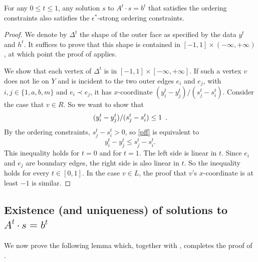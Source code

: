 
\begin{lem}
   For any $0\le t\le 1$, any solution $s$ to $A^t\cdot s = b^t$
   that satisfies the ordering constraints also satisfies the
   $\epsilon^*$-strong ordering constraints. 
\end{lem}

\begin{proof}
We denote by $\Delta^t$ the shape of the outer face as specified by
the data $y^t$ and $h^t$.  
It suffices to prove that this shape
is contained in
  $[-1,1]\times(-\infty,+\infty)$,
  at which point the proof of  applies.

We show that each vertex of $\Delta^t$ is in $[-1,1]\times[-\infty,+\infty]$.
If such a vertex $v$ does not lie on $Y$ and is incident to
the two outer edges
$e_i$ and $e_j$, with $i,j\in \{1,a,b,m\}$ and $e_i \prec e_j$, it
has $x$-coordinate $( y_i^t - y_j^t ) / ( s_j^t - 
s_i^t )$.
Consider the case that $v\in R$. So we want to show that
\begin{equation}
( y_i^t - y_j^t ) / ( s_j^t - s_i^t )  \le 1 \enspace . \eqlabel{pff}
\end{equation}
By the ordering constraints, $s_j^t - s_i^t > 0$, so \eqref{pff} is
equivalent to
\begin{equation*}
  y_i^t - y_j^t  \le  s_j^t - s_i^t.
\end{equation*}
This inequality holds for $t=0$ and for $t=1$. The left side is linear
in $t$.
Since $e_i$ and $e_j$ are boundary edges, the right side is also
linear in $t$.
So the inequality holds for 
every $t\in [0,1]$.
In the case $v\in L$, the proof that $v$'s $x$-coordinate is at 
least $-1$ is similar.
\end{proof}


\subsection{Existence (and uniqueness) of solutions to $A^t\cdot s=b^t$}

We now prove the following lemma which, together with , completes the proof of .

